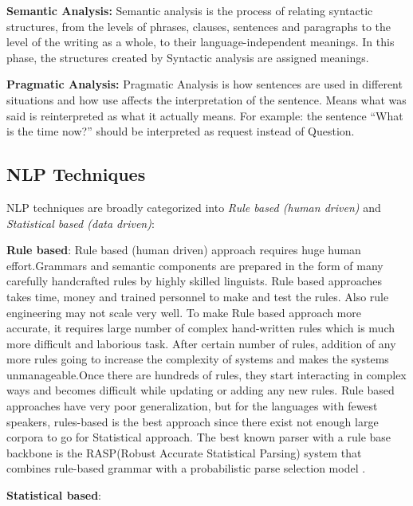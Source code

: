 \documentclass[sigconf]{acmart}
\begin{document}
\par\null\par
\textbf{Semantic Analysis:}
     Semantic analysis is the process of relating syntactic structures, from the levels of phrases, clauses, sentences and paragraphs to the level of the writing as a whole, to their language-independent meanings. In this phase, the structures created by Syntactic analysis are assigned meanings.
\par\null\par
\textbf{Pragmatic Analysis:}
     Pragmatic Analysis is how sentences are used in different situations and how use affects the interpretation of the sentence. Means what was said is reinterpreted as what it actually means. For example: the sentence ``What is the time now?'' should be interpreted as request instead of Question.
\subsection{NLP Techniques}
NLP techniques are broadly categorized into \textit{Rule based (human driven)} and \textit{Statistical based (data driven)}:
\par\null\par
\textbf{Rule based}:
   Rule based (human driven) approach requires huge human effort.Grammars and semantic components are prepared in the form of many carefully handcrafted rules by highly skilled linguists. Rule based approaches takes time, money and trained personnel to make and test the rules. Also rule engineering may not scale very well. To make Rule based approach more accurate, it requires large number of complex hand-written rules which is  much more difficult and laborious task. After certain number of rules, addition of any more rules going to increase the complexity of systems and makes the systems unmanageable.Once there are hundreds of rules, they start interacting in complex ways and becomes difficult while updating or adding any new rules. Rule based approaches have very poor generalization, but for the languages with fewest speakers, rules-based is the best approach since there exist not enough large corpora to go for Statistical approach. The  best  known  parser  with  a  rule base  backbone is the RASP(Robust Accurate Statistical Parsing) system that combines rule-based grammar with a probabilistic parse selection model \cite{Kovář2014}.
\par\null\par
\textbf{Statistical based}:
\end{document}
